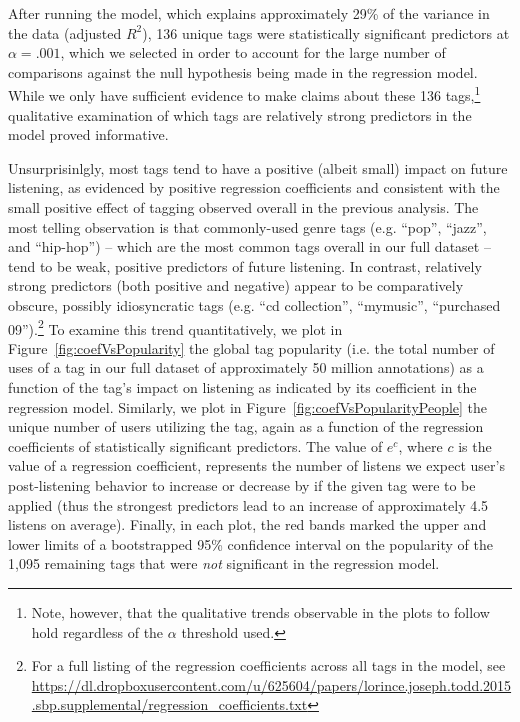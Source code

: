 After running the model, which explains approximately 29\% of the variance in the data (adjusted $R^{2}$), 136 unique tags were statistically significant predictors at $\alpha =.001$, which we selected in order to account for the large number of comparisons against the null hypothesis being made in the regression model. While we only have sufficient evidence to make claims about these 136 tags,\footnote{Note, however, that the qualitative trends observable in the plots to follow hold regardless of the $\alpha$ threshold used.} qualitative examination of which tags are relatively strong predictors in the model proved informative.

Unsurprisinlgly, most tags tend to have a positive (albeit small) impact on future listening, as evidenced by positive regression coefficients and consistent with the small positive effect of tagging observed overall in the previous analysis. The most telling observation is that commonly-used genre tags (e.g. ``pop'', ``jazz'', and ``hip-hop'') -- which are the most common tags overall in our full dataset -- tend to be weak, positive predictors of future listening. In contrast, relatively strong predictors (both positive and negative) appear to be comparatively obscure, possibly idiosyncratic tags (e.g. ``cd collection'', ``mymusic'', ``purchased 09'').\footnote{For a full listing of the regression coefficients across all tags in the model, see \url{https://dl.dropboxusercontent.com/u/625604/papers/lorince.joseph.todd.2015.sbp.supplemental/regression_coefficients.txt}} To examine this trend quantitatively, we plot in Figure~\ref{fig:coefVsPopularity} the global tag popularity (i.e. the total number of uses of a tag in our full dataset of approximately 50 million annotations) as a function of the tag's impact on listening as indicated by its coefficient in the regression model. Similarly, we plot in Figure~\ref{fig:coefVsPopularityPeople} the unique number of users utilizing the tag, again as a function of the regression coefficients of statistically significant predictors. The value of $e^c$, where $c$ is the value of a regression coefficient, represents the number of listens we expect user's post-listening behavior to increase or decrease by if the given tag were to be applied (thus the strongest predictors lead to an increase of approximately 4.5 listens on average). Finally, in each plot, the red bands marked the upper and lower limits of a bootstrapped 95\% confidence interval on the popularity of the 1,095 remaining tags that were \emph{not} significant in the regression model. 
